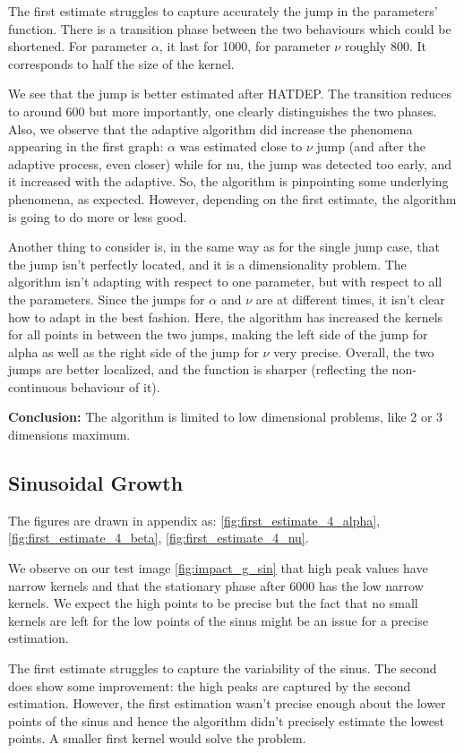 The first estimate struggles to capture accurately the jump in the parameters' function. There is a transition phase between the two behaviours which could be shortened. For parameter $\alpha$, it last for 1000, for parameter $\nu$ roughly 800. It corresponds to half the size of the kernel.

We see that the jump is better estimated after HATDEP. The transition reduces to around 600 but more importantly, one clearly distinguishes the two phases. Also, we observe that the adaptive algorithm did increase the phenomena appearing in the first graph: $\alpha$ was estimated close to $\nu$ jump (and after the adaptive process, even closer) while for nu, the jump was detected too early, and it increased with the adaptive. So, the algorithm is pinpointing some underlying phenomena, as expected. However, depending on the first estimate, the algorithm is going to do more or less good.

Another thing to consider is, in the same way as for the single jump case, that the jump isn't perfectly located, and it is a dimensionality problem. The algorithm isn't adapting with respect to one parameter, but with respect to all the parameters. Since the jumps for $\alpha$ and $\nu$ are at different times, it isn't clear how to adapt in the best fashion. Here, the algorithm has increased the kernels for all points in between the two jumps, making the left side of the jump for alpha as well as the right side of the jump for $\nu$ very precise. Overall, the two jumps are better localized, and the function is sharper (reflecting the non-continuous behaviour of it).

\textbf{Conclusion:} The algorithm is limited to low dimensional problems, like 2 or 3 dimensions maximum.

\subsection{Sinusoidal Growth}
The figures are drawn in appendix as: \ref{fig:first_estimate_4_alpha}, \ref{fig:first_estimate_4_beta}, \ref{fig:first_estimate_4_nu}.

We observe on our test image \ref{fig:impact_g_sin} that high peak values have narrow kernels and that the stationary phase after 6000 has the low narrow kernels. We expect the high points to be precise but the fact that no small kernels are left for the low points of the sinus might be an issue for a precise estimation.


The first estimate struggles to capture the variability of the sinus. The second does show some improvement: the high peaks are captured by the second estimation. However, the first estimation wasn't precise enough about the lower points of the sinus and hence the algorithm didn't precisely estimate the lowest points. A smaller first kernel would solve the problem. 


